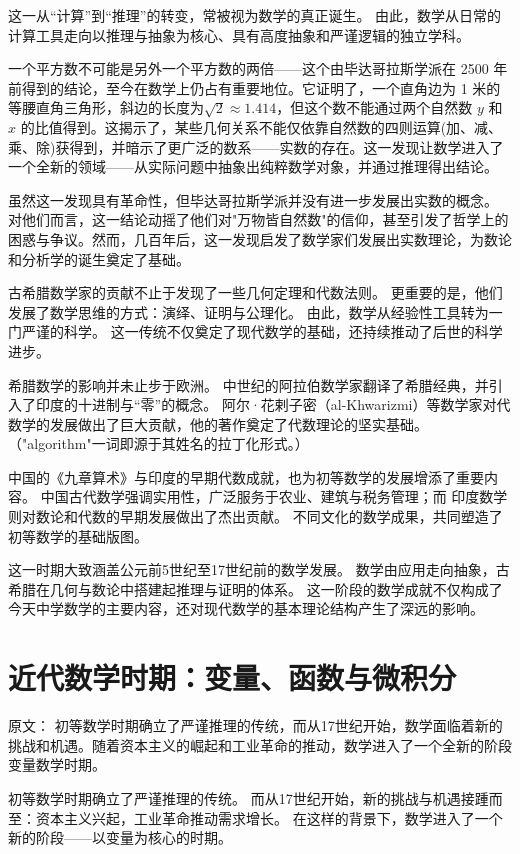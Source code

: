 这一从“计算”到“推理”的转变，常被视为数学的真正诞生。  
由此，数学从日常的计算工具走向以推理与抽象为核心、具有高度抽象和严谨逻辑的独立学科。

一个平方数不可能是另外一个平方数的两倍——这个由毕达哥拉斯学派在 2500 年前得到的结论，至今在数学上仍占有重要地位。它证明了，一个直角边为 1 米的等腰直角三角形，斜边的长度为$\sqrt{2}\approx1.414$，但这个数不能通过两个自然数 $y$ 和 $x$ 的比值得到。这揭示了，某些几何关系不能仅依靠自然数的四则运算(加、减、乘、除)获得到，并暗示了更广泛的数系——实数的存在。这一发现让数学进入了一个全新的领域——从实际问题中抽象出纯粹数学对象，并通过推理得出结论。

虽然这一发现具有革命性，但毕达哥拉斯学派并没有进一步发展出实数的概念。
对他们而言，这一结论动摇了他们对"万物皆自然数"的信仰，甚至引发了哲学上的困惑与争议。然而，几百年后，这一发现启发了数学家们发展出实数理论，为数论和分析学的诞生奠定了基础。


古希腊数学家的贡献不止于发现了一些几何定理和代数法则。  
更重要的是，他们发展了数学思维的方式：演绎、证明与公理化。  
由此，数学从经验性工具转为一门严谨的科学。  
这一传统不仅奠定了现代数学的基础，还持续推动了后世的科学进步。


希腊数学的影响并未止步于欧洲。  
中世纪的阿拉伯数学家翻译了希腊经典，并引入了印度的十进制与“零”的概念。  
阿尔·花剌子密（al-Khwarizmi）等数学家对代数学的发展做出了巨大贡献，他的著作奠定了代数理论的坚实基础。（"algorithm"一词即源于其姓名的拉丁化形式。）


中国的《九章算术》与印度的早期代数成就，也为初等数学的发展增添了重要内容。  
中国古代数学强调实用性，广泛服务于农业、建筑与税务管理；而 印度数学则对数论和代数的早期发展做出了杰出贡献。  
不同文化的数学成果，共同塑造了初等数学的基础版图。


这一时期大致涵盖公元前5世纪至17世纪前的数学发展。 数学由应用走向抽象，古希腊在几何与数论中搭建起推理与证明的体系。  
这一阶段的数学成就不仅构成了今天中学数学的主要内容，还对现代数学的基本理论结构产生了深远的影响。

\section{近代数学时期：变量、函数与微积分}
原文：
初等数学时期确立了严谨推理的传统，而从17世纪开始，数学面临着新的挑战和机遇。随着资本主义的崛起和工业革命的推动，数学进入了一个全新的阶段变量数学时期。




初等数学时期确立了严谨推理的传统。  
而从17世纪开始，新的挑战与机遇接踵而至：资本主义兴起，工业革命推动需求增长。  
在这样的背景下，数学进入了一个新的阶段——以变量为核心的时期。







